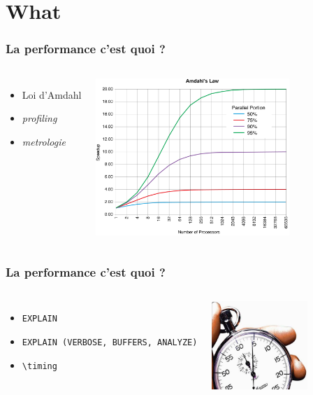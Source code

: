 \documentclass{beamer}
\begin{document}
\section{What}

\begin{frame}
  \frametitle{La performance c'est quoi ?}

  \vfill

\begin{columns}[c]

  \begin{itemize}
  \item Loi d'Amdahl
  \item \textit{profiling}
  \item \textit{metrologie}
  \end{itemize}

\begin{center}
  \includegraphics[height=16em]{amdahlslaw.png}
\end{center}
\end{columns}
\end{frame}

\begin{frame}
  \frametitle{La performance c'est quoi ?}

  \vfill

\begin{columns}[c]

  \begin{itemize}
  \item \texttt{EXPLAIN}
  \item \texttt{EXPLAIN (VERBOSE, BUFFERS, ANALYZE)}
  \item \texttt{{\textbackslash}timing}
  \end{itemize}

\begin{center}
  \includegraphics[height=9em]{timing.jpg}
\end{center}
\end{columns}
\end{frame}
\end{document}
